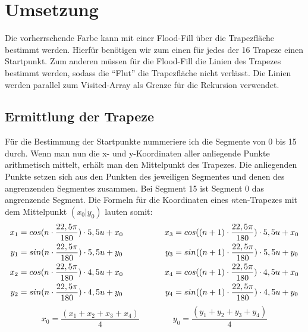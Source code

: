 \section{Umsetzung}
Die vorherrschende Farbe kann mit einer Flood-Fill über die Trapezfläche bestimmt werden. Hierfür benötigen wir zum einen für jedes der 16 Trapeze einen Startpunkt. Zum anderen müssen für die Flood-Fill die Linien des Trapezes bestimmt werden, sodass die "`Flut"' die Trapezfläche nicht verlässt. Die Linien werden parallel zum Visited-Array als Grenze für die Rekursion verwendet.

\subsection{Ermittlung der Trapeze}
Für die Bestimmung der Startpunkte nummeriere ich die Segmente von 0 bis 15 durch. Wenn man nun die x- und y-Koordinaten aller anliegende Punkte arithmetisch mittelt, erhält man den Mittelpunkt des Trapezes. Die anliegenden Punkte setzen sich aus den Punkten des jeweiligen Segmentes und denen des angrenzenden Segmentes zusammen. Bei Segment 15 ist Segment 0 das angrenzende Segment. Die Formeln für die Koordinaten eines \textit{n}ten-Trapezes mit dem Mittelpunkt \((x_0|y_0)\) lauten somit:
\begin{gather}
	\begin{split}
		x_1 &= cos(n \cdot \frac{22,5\pi}{180}) \cdot 5,5u + x_0\\
		y_1 &= sin(n \cdot \frac{22,5\pi}{180}) \cdot 5,5u + y_0\\ \vspace{2em}
		x_2 &= cos(n \cdot \frac{22,5\pi}{180}) \cdot 4,5u + x_0\\
		y_2 &= sin(n \cdot \frac{22,5\pi}{180}) \cdot 4,5u + y_0
	\end{split}
	\hspace{5em}
	\begin{split}
		x_3 &= cos((n+1) \cdot \frac{22,5\pi}{180}) \cdot 5,5u + x_0\\
		y_3 &= sin((n+1) \cdot \frac{22,5\pi}{180}) \cdot 5,5u + y_0 \\ \vspace{2em}
		x_4 &= cos((n+1) \cdot \frac{22,5\pi}{180}) \cdot 4,5u + x_0\\
		y_4 &= sin((n+1) \cdot \frac{22,5\pi}{180}) \cdot 4,5u + y_0
	\end{split} \label{eq:nKoords}
\end{gather}
\begin{equation}
	x_0 = \frac{(x_1+x_2+x_3+x_4)}{4} \hspace{4em} y_0 = \frac{(y_1+y_2+y_3+y_4)}{4}
\end{equation}

